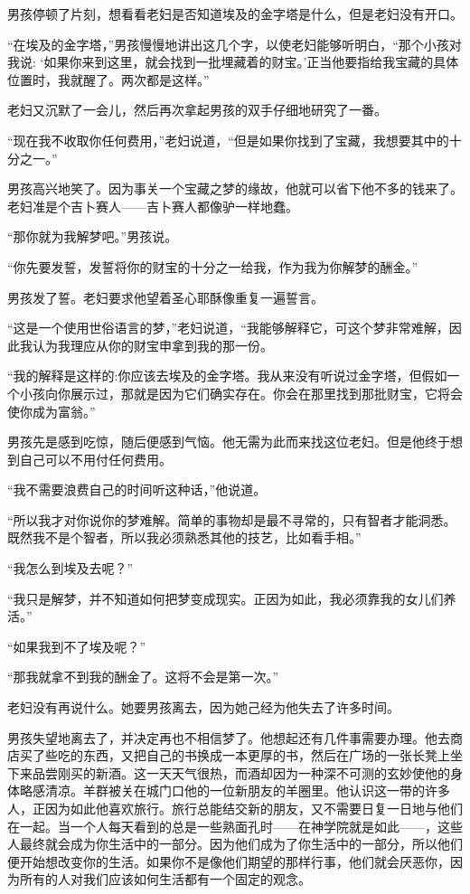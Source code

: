 \documentclass[twoside,openany]{book}
\begin{document}
男孩停顿了片刻，想看看老妇是否知道埃及的金字塔是什么，但是老妇没有开口。

“在埃及的金字塔，”男孩慢慢地讲出这几个字，以使老妇能够听明白，“那个小孩对我说: ‘如果你来到这里，就会找到一批埋藏着的财宝。’正当他要指给我宝藏的具体位置时，我就醒了。两次都是这样。”

老妇又沉默了一会儿，然后再次拿起男孩的双手仔细地研究了一番。

“现在我不收取你任何费用，”老妇说道，“但是如果你找到了宝藏，我想要其中的十分之一。”

男孩高兴地笑了。因为事关一个宝藏之梦的缘故，他就可以省下他不多的钱来了。老妇准是个吉卜赛人——吉卜赛人都像驴一样地蠢。

“那你就为我解梦吧。”男孩说。

“你先要发誓，发誓将你的财宝的十分之一给我，作为我为你解梦的酬金。”

男孩发了誓。老妇要求他望着圣心耶酥像重复一遍誓言。

“这是一个使用世俗语言的梦，”老妇说道，“我能够解释它，可这个梦非常难解，因此我认为我理应从你的财宝申拿到我的那一份。

“我的解释是这样的:你应该去埃及的金字塔。我从来没有听说过金字塔，但假如一个小孩向你展示过，那就是因为它们确实存在。你会在那里找到那批财宝，它将会使你成为富翁。”

男孩先是感到吃惊，随后便感到气恼。他无需为此而来找这位老妇。但是他终于想到自己可以不用付任何费用。

“我不需要浪费自己的时间听这种话，”他说道。

“所以我才对你说你的梦难解。简单的事物却是最不寻常的，只有智者才能洞悉。既然我不是个智者，所以我必须熟悉其他的技艺，比如看手相。”

“我怎么到埃及去呢？”

“我只是解梦，并不知道如何把梦变成现实。正因为如此，我必须靠我的女儿们养活。”

“如果我到不了埃及呢？”

“那我就拿不到我的酬金了。这将不会是第一次。”

老妇没有再说什么。她要男孩离去，因为她己经为他失去了许多时间。

男孩失望地离去了，并决定再也不相信梦了。他想起还有几件事需要办理。他去商店买了些吃的东西，又把自己的书换成一本更厚的书，然后在广场的一张长凳上坐下来品尝刚买的新酒。这一天天气很热，而酒却因为一种深不可测的玄妙使他的身体略感清凉。羊群被关在城门口他的一位新朋友的羊圈里。他认识这一带的许多人，正因为如此他喜欢旅行。旅行总能结交新的朋友，又不需要日复一日地与他们在一起。当一个人每天看到的总是一些熟面孔时——在神学院就是如此——，这些人最终就会成为你生活中的一部分。因为他们成为了你生活中的一部分，所以他们便开始想改变你的生活。如果你不是像他们期望的那样行事，他们就会厌恶你，因为所有的人对我们应该如何生活都有一个固定的观念。
\end{document}

